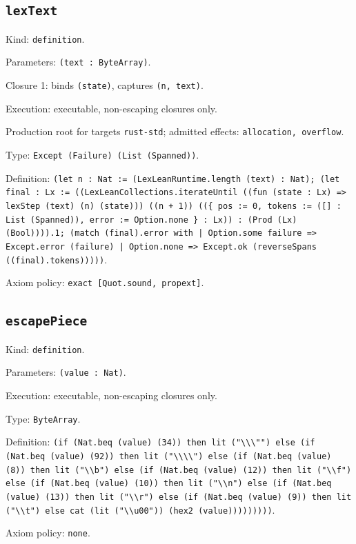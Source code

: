 \documentclass[11pt]{article}
\begin{document}
\subsection*{\texttt{lexText}}
\noindent Kind: \texttt{definition}.\par
\noindent Parameters: \texttt{(text : ByteArray)}.\par
\noindent Closure 1: binds \texttt{(state)}, captures \texttt{(n, text)}.\par
\noindent Execution: executable, non-escaping closures only.\par
\noindent Production root for targets \texttt{rust-std}; admitted effects: \texttt{allocation, overflow}.\par
\noindent Type: \texttt{Except (Failure) (List (Spanned))}.\par
\noindent Definition: \texttt{(let n : Nat := (LexLeanRuntime.length (text) : Nat); (let final : Lx := ((LexLeanCollections.iterateUntil ((fun (state : Lx) => lexStep (text) (n) (state))) ((n + 1)) ((\{ pos := 0, tokens := ([] : List (Spanned)), error := Option.none \} : Lx)) : (Prod (Lx) (Bool)))).1; (match (final).error with | Option.some failure => Except.error (failure) | Option.none => Except.ok (reverseSpans ((final).tokens)))))}.\par
\noindent Axiom policy: \texttt{exact [Quot.sound, propext]}.\par
\subsection*{\texttt{escapePiece}}
\noindent Kind: \texttt{definition}.\par
\noindent Parameters: \texttt{(value : Nat)}.\par
\noindent Execution: executable, non-escaping closures only.\par
\noindent Type: \texttt{ByteArray}.\par
\noindent Definition: \texttt{(if (Nat.beq (value) (34)) then lit ("\textbackslash{}\textbackslash{}\textbackslash{}"") else (if (Nat.beq (value) (92)) then lit ("\textbackslash{}\textbackslash{}\textbackslash{}\textbackslash{}") else (if (Nat.beq (value) (8)) then lit ("\textbackslash{}\textbackslash{}b") else (if (Nat.beq (value) (12)) then lit ("\textbackslash{}\textbackslash{}f") else (if (Nat.beq (value) (10)) then lit ("\textbackslash{}\textbackslash{}n") else (if (Nat.beq (value) (13)) then lit ("\textbackslash{}\textbackslash{}r") else (if (Nat.beq (value) (9)) then lit ("\textbackslash{}\textbackslash{}t") else cat (lit ("\textbackslash{}\textbackslash{}u00")) (hex2 (value)))))))))}.\par
\noindent Axiom policy: \texttt{none}.\par
\end{document}
